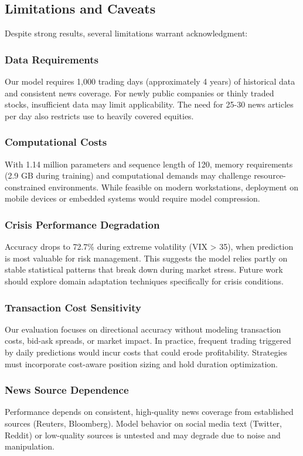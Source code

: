 \documentclass[conference]{IEEEtran}
\begin{document}
\subsection{Limitations and Caveats}

Despite strong results, several limitations warrant acknowledgment:

\subsubsection{Data Requirements}
Our model requires 1,000 trading days (approximately 4 years) of historical data and consistent news coverage. For newly public companies or thinly traded stocks, insufficient data may limit applicability. The need for 25-30 news articles per day also restricts use to heavily covered equities.

\subsubsection{Computational Costs}
With 1.14 million parameters and sequence length of 120, memory requirements (2.9 GB during training) and computational demands may challenge resource-constrained environments. While feasible on modern workstations, deployment on mobile devices or embedded systems would require model compression.

\subsubsection{Crisis Performance Degradation}
Accuracy drops to 72.7\% during extreme volatility (VIX > 35), when prediction is most valuable for risk management. This suggests the model relies partly on stable statistical patterns that break down during market stress. Future work should explore domain adaptation techniques specifically for crisis conditions.

\subsubsection{Transaction Cost Sensitivity}
Our evaluation focuses on directional accuracy without modeling transaction costs, bid-ask spreads, or market impact. In practice, frequent trading triggered by daily predictions would incur costs that could erode profitability. Strategies must incorporate cost-aware position sizing and hold duration optimization.

\subsubsection{News Source Dependence}
Performance depends on consistent, high-quality news coverage from established sources (Reuters, Bloomberg). Model behavior on social media text (Twitter, Reddit) or low-quality sources is untested and may degrade due to noise and manipulation.
\end{document}
